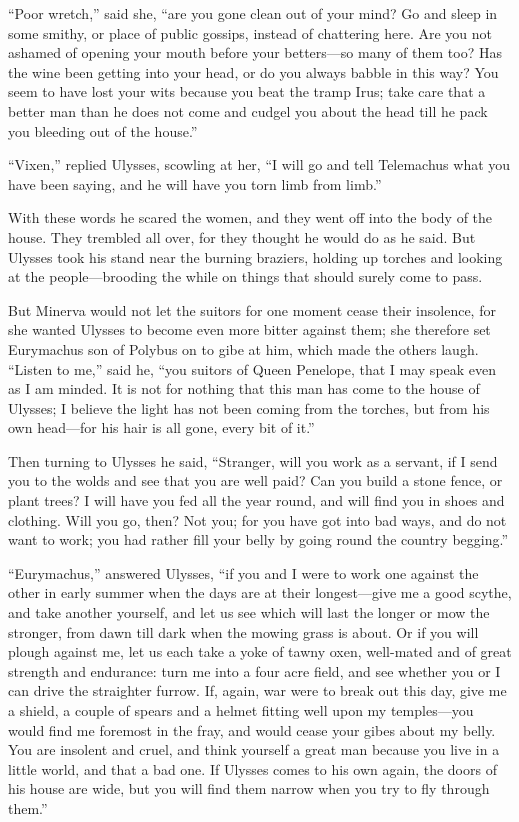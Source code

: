 “Poor wretch,” said she, “are you gone clean out of your mind? Go and sleep in
some smithy, or place of public gossips, instead of chattering here. Are you
not ashamed of opening your mouth before your betters—so many of them too? Has
the wine been getting into your head, or do you always babble in this way? You
seem to have lost your wits because you beat the tramp Irus; take care that a
better man than he does not come and cudgel you about the head till he pack you
bleeding out of the house.”

“Vixen,” replied Ulysses, scowling at her, “I will go and tell Telemachus what
you have been saying, and he will have you torn limb from limb.”

With these words he scared the women, and they went off into the body of the
house. They trembled all over, for they thought he would do as he said. But
Ulysses took his stand near the burning braziers, holding up torches and
looking at the people—brooding the while on things that should surely come to
pass.

But Minerva would not let the suitors for one moment cease their insolence, for
she wanted Ulysses to become even more bitter against them; she therefore set
Eurymachus son of Polybus on to gibe at him, which made the others laugh.
“Listen to me,” said he, “you suitors of Queen Penelope, that I may speak even
as I am minded. It is not for nothing that this man has come to the house of
Ulysses; I believe the light has not been coming from the torches, but from his
own head—for his hair is all gone, every bit of it.”

Then turning to Ulysses he said, “Stranger, will you work as a servant, if I
send you to the wolds and see that you are well paid? Can you build a stone
fence, or plant trees? I will have you fed all the year round, and will find
you in shoes and clothing. Will you go, then? Not you; for you have got into
bad ways, and do not want to work; you had rather fill your belly by going
round the country begging.”

“Eurymachus,” answered Ulysses, “if you and I were to work one against the
other in early summer when the days are at their longest—give me a good scythe,
and take another yourself, and let us see which will last the longer or mow the
stronger, from dawn till dark when the mowing grass is about. Or if you will
plough against me, let us each take a yoke of tawny oxen, well-mated and of
great strength and endurance: turn me into a four acre field, and see whether
you or I can drive the straighter furrow. If, again, war were to break out this
day, give me a shield, a couple of spears and a helmet fitting well upon my
temples—you would find me foremost in the fray, and would cease your gibes
about my belly. You are insolent and cruel, and think yourself a great man
because you live in a little world, and that a bad one. If Ulysses comes to his
own again, the doors of his house are wide, but you will find them narrow when
you try to fly through them.”

